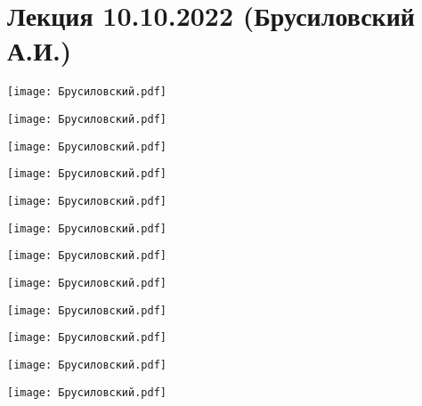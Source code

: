 \documentclass[main.tex]{subfiles}
\begin{document}
\section{Лекция 10.10.2022 (Брусиловский А.И.)}

\begin{center}
\texttt{[image: Брусиловский.pdf]}
\end{center}

\begin{center}
\texttt{[image: Брусиловский.pdf]}
\end{center}

\begin{center}
\texttt{[image: Брусиловский.pdf]}
\end{center}

\begin{center}
\texttt{[image: Брусиловский.pdf]}
\end{center}

\begin{center}
\texttt{[image: Брусиловский.pdf]}
\end{center}

\begin{center}
\texttt{[image: Брусиловский.pdf]}
\end{center}

\begin{center}
\texttt{[image: Брусиловский.pdf]}
\end{center}

\begin{center}
\texttt{[image: Брусиловский.pdf]}
\end{center}

\begin{center}
\texttt{[image: Брусиловский.pdf]}
\end{center}

\begin{center}
\texttt{[image: Брусиловский.pdf]}
\end{center}

\begin{center}
\texttt{[image: Брусиловский.pdf]}
\end{center}

\begin{center}
\texttt{[image: Брусиловский.pdf]}
\end{center}
\end{document}

